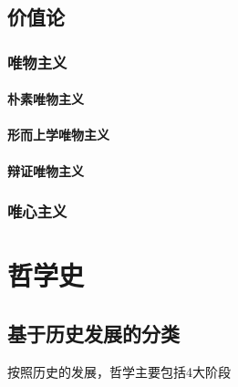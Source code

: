 \documentclass[UTF8]{../RepresentationUniverse}
\begin{document}
\section{价值论}
    \subsection{唯物主义}
        \subsubsection{朴素唯物主义}
        \subsubsection{形而上学唯物主义}
        \subsubsection{辩证唯物主义}
    \subsection{唯心主义}


    




\chapter{哲学史}





\section{基于历史发展的分类}
按照历史的发展，哲学主要包括4大阶段
\end{document}
